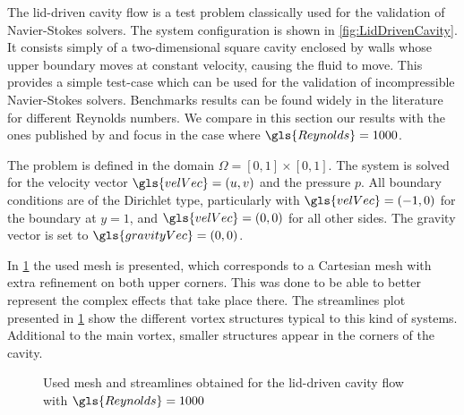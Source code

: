 The lid-driven cavity flow is a test problem classically used for the validation of Navier-Stokes solvers. The system configuration is shown in \cref{fig:LidDrivenCavity}. It consists simply of a two-dimensional square cavity  enclosed by walls whose upper boundary moves at constant velocity, causing the fluid to move. This provides a simple test-case which can be used for the validation of incompressible Navier-Stokes solvers. Benchmarks results can be found widely in the literature for different Reynolds numbers. We compare in this section our results with the ones published by \cite{botellaBenchmarkSpectralResults1998} and focus in the case where $\gls{Reynolds} = 1000$. 

The problem is defined in the domain $\Omega = [0,1]\times [0,1]$. The system is solved for the velocity vector $\gls{velVec} = (u,v)$ and the pressure $p$. All boundary conditions are of the Dirichlet type, particularly with $\gls{velVec} = (-1,0)$ for the boundary at $y = 1$, and $\gls{velVec} = (0,0)$ for all other sides. The gravity vector is set to $\gls{gravityVec} = (0,0)$. 

 In \cref{fig:LiddrivenMesh} the used mesh is presented, which corresponds to a Cartesian mesh with extra refinement on both upper corners. This was done to be able to better represent the complex effects that take place there.  The streamlines plot presented in \cref{fig:LiddrivenMesh} show the different vortex structures typical to this kind of systems. Additional to the main vortex, smaller structures appear in the corners of the cavity. 
	
	\begin{figure}[t]
		\centering
		\pgfplotsset{width=0.35 \textwidth, compat=1.3}	
		\caption{Used mesh and streamlines obtained for the lid-driven cavity flow with $\gls{Reynolds} = 1000$} \label{fig:LiddrivenMesh}
	\end{figure}


